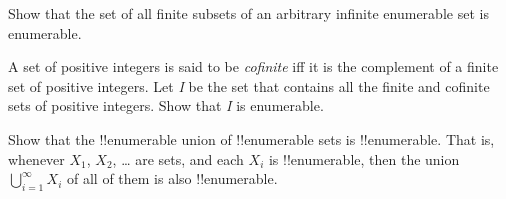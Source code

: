 \documentclass[../../../include/open-logic-section]{subfiles}
\begin{document}
\begin{prob}
Show that the set of all finite subsets of an arbitrary infinite
enumerable set is enumerable.
\end{prob}

\begin{prob}
A set of positive integers is said to be \emph{cofinite} iff
it is the complement of a finite set of positive integers. Let
\emph{I} be the set that contains all the finite and cofinite sets of
positive integers. Show that \emph{I} is enumerable.
\end{prob}

\begin{prob}
Show that the !!{enumerable} union of !!{enumerable} sets is
!!{enumerable}. That is, whenever $X_1$, $X_2$, \dots{} are sets, and
each $X_i$ is !!{enumerable}, then the union $\bigcup_{i=1}^\infty
X_i$ of all of them is also !!{enumerable}.
\end{prob}
\end{document}
